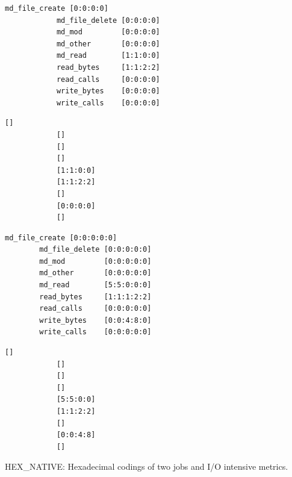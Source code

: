 \documentclass{jhps}
\begin{document}
\begin{listing}
	\noindent\begin{minipage}{\textwidth}
		\noindent\begin{minipage}{0.6\textwidth}
			\begin{lstlisting}[basicstyle=\fontsize{8}{8}\ttfamily]
			md_file_create [0:0:0:0]
			md_file_delete [0:0:0:0]
			md_mod         [0:0:0:0]
			md_other       [0:0:0:0]
			md_read        [1:1:0:0]
			read_bytes     [1:1:2:2]
			read_calls     [0:0:0:0]
			write_bytes    [0:0:0:0]
			write_calls    [0:0:0:0]
			\end{lstlisting}
			\vspace{-2em}
			\label{lst:sim:hex_hative:job_a}
		\end{minipage}
		\noindent\begin{minipage}{0.39\textwidth}
			\begin{lstlisting}[basicstyle=\fontsize{8}{8}\ttfamily]
			[]
			[]
			[]
			[]
			[1:1:0:0]
			[1:1:2:2]
			[]
			[0:0:0:0]
			[]
			\end{lstlisting}
			\vspace{-2em}
			\label{lst:sim:hex_native:job_a:mio}
		\end{minipage}
	\end{minipage}

	\noindent\begin{minipage}{\textwidth}
		\noindent\begin{minipage}{0.60\textwidth}
		\begin{lstlisting}[basicstyle=\fontsize{8}{8}\ttfamily]
		md_file_create [0:0:0:0:0]
		md_file_delete [0:0:0:0:0]
		md_mod         [0:0:0:0:0]
		md_other       [0:0:0:0:0]
		md_read        [5:5:0:0:0]
		read_bytes     [1:1:1:2:2]
		read_calls     [0:0:0:0:0]
		write_bytes    [0:0:4:8:0]
		write_calls    [0:0:0:0:0]
		\end{lstlisting}
		\vspace{-2em}
		\label{lst:sim:hex_native:job_b}
		\end{minipage}
		\noindent\begin{minipage}{0.39\textwidth}
			\begin{lstlisting}[basicstyle=\fontsize{8}{8}\ttfamily]
			[]
			[]
			[]
			[]
			[5:5:0:0]
			[1:1:2:2]
			[]
			[0:0:4:8]
			[]
			\end{lstlisting}
			\vspace{-2em}
			\label{lst:sim:hex_native:job_b:mio}
		\end{minipage}
	\end{minipage}
	\caption{HEX\_NATIVE: Hexadecimal codings of two jobs and I/O intensive metrics.}
	\label{lst:sim:hex_native}
\end{listing}
\end{document}
